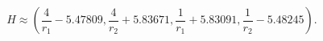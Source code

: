 \begin{equation}
 H \approx (\frac{4}{r_1}-5.47809,\frac{4}{r_2}+5.83671,
 \frac{1}{r_1}+5.83091,\frac{1}{r_2}-5.48245).
\end{equation}

